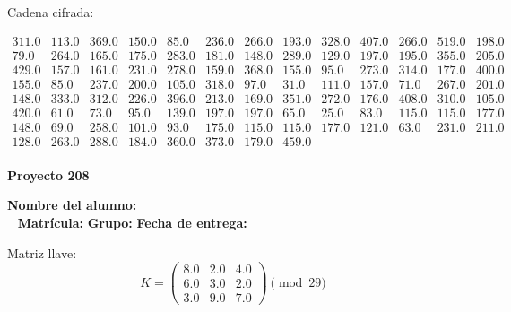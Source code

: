 \documentclass[12pt]{article}
\begin{document}
Cadena cifrada:
\begin{center}
$\begin{array}{lllllllllllll}
311.0 & 113.0 & 369.0 & 150.0 & 85.0 & 236.0 & 266.0 & 193.0 & 328.0 & 407.0 & 266.0 & 519.0 & 198.0\\
79.0 & 264.0 & 165.0 & 175.0 & 283.0 & 181.0 & 148.0 & 289.0 & 129.0 & 197.0 & 195.0 & 355.0 & 205.0\\
429.0 & 157.0 & 161.0 & 231.0 & 278.0 & 159.0 & 368.0 & 155.0 & 95.0 & 273.0 & 314.0 & 177.0 & 400.0\\
155.0 & 85.0 & 237.0 & 200.0 & 105.0 & 318.0 & 97.0 & 31.0 & 111.0 & 157.0 & 71.0 & 267.0 & 201.0\\
148.0 & 333.0 & 312.0 & 226.0 & 396.0 & 213.0 & 169.0 & 351.0 & 272.0 & 176.0 & 408.0 & 310.0 & 105.0\\
420.0 & 61.0 & 73.0 & 95.0 & 139.0 & 197.0 & 197.0 & 65.0 & 25.0 & 83.0 & 115.0 & 115.0 & 177.0\\
148.0 & 69.0 & 258.0 & 101.0 & 93.0 & 175.0 & 115.0 & 115.0 & 177.0 & 121.0 & 63.0 & 231.0 & 211.0\\
128.0 & 263.0 & 288.0 & 184.0 & 360.0 & 373.0 & 179.0 & 459.0\\
\end{array}$
\end{center}

\newpage


\textbf{Proyecto 208}

\textbf{Nombre del alumno:} \underline{\hspace{13cm}}\\\
\vspace{1cm}
\textbf{Matrícula:} \underline{\hspace{4cm}} \hspace{1cm}
\textbf{Grupo:} \underline{\hspace{2cm}}
\textbf{Fecha de entrega:} \underline{\hspace{2cm}}

\medskip

Matriz llave:
\[
K = \begin{pmatrix}
8.0 & 2.0 & 4.0\\
6.0 & 3.0 & 2.0\\
3.0 & 9.0 & 7.0
\end{pmatrix} \pmod{29}
\]
\end{document}
